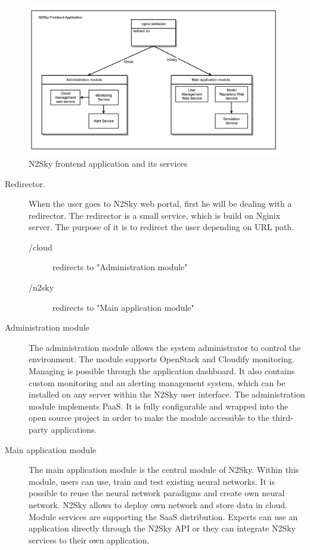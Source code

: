 \begin{figure}[htbp]
\begin{center}
  \includegraphics[width=\linewidth]{components/2/modular_design.png}
  \caption{N2Sky frontend application and its services}
  \label{fig:modular_design}
\end{center}
\end{figure}

\begin{description}
\item[Redirector.] When the user goes to N2Sky web portal, first he will be dealing with a redirector. The redirector is a small service, which is build on Nginix server. The purpose of it is to redirect the user depending on URL path.
\begin{description}
\item[/cloud] redirects to "Administration module"
\item[/n2sky] redirects to "Main application module"
\end{description}


\item[Administration module] The administration module allows the system administrator to control the environment. The module supports OpenStack and Cloudify monitoring. Managing is possible through the application dashboard. It also contains custom monitoring and an alerting management system, which can be installed on any server within the N2Sky user interface. The administration module implements PaaS. It is fully configurable and wrapped into the open source project in order to make the module accessible to the third-party applications. 
\item[Main application module] The main application module is the central module of N2Sky. Within this module, users can use, train and test existing neural networks. It is possible to reuse the neural network paradigms and create own neural network. N2Sky allows to deploy own network and store data in cloud. Module services are supporting the SaaS distribution. Experts can use an application directly through the N2Sky API or they can integrate N2Sky services to their own application. 
\end{description}


